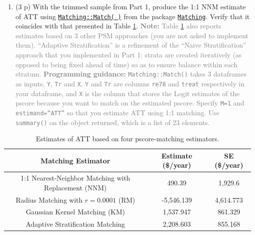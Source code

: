 \documentclass[
]{article}
\providecommand{\tightlist}{%
  \setlength{\itemsep}{0pt}\setlength{\parskip}{0pt}}
\begin{document}
\begin{enumerate}
\def\labelenumi{\arabic{enumi}.}
\setcounter{enumi}{5}
\tightlist
\item
  (3 p) With the trimmed sample from Part 1, produce the 1:1 NNM
  estimate of ATT using
  \href{https://www.rdocumentation.org/packages/Matching/versions/4.9-6/topics/Match}{\texttt{Matching::Match( )}}
  from the package
  \href{https://cran.r-project.org/web/packages/Matching/Matching.pdf}{\texttt{Matching}}.
  Verify that it coincides with that presented in Table
  \ref{tab:Tab25-4_2}.
  \textcolor{gray}{\textbf{Note:} Table \ref{tab:Tab25-4_2} also reports estimates based on 3 other PSM approaches (you are not asked to implement them). ``Adaptive Stratification'' is a refinement of the ``Naive Stratification'' approach that you implemented in Part 1: strata are created iteratively (as opposed to being fixed ahead of time) so as to ensure balance within each stratum.}
  \textcolor{gray}{\textbf{Programming guidance:} \texttt{Matching::Match()} takes 3 dataframes as inputs, \texttt{Y}, \texttt{Tr} and \texttt{X}. \texttt{Y} and \texttt{Tr} are columns \texttt{re78} and \texttt{treat} respectively in your dataframe, and \texttt{X} is the column that stores the Logit estimates of the pscore because you want to match on the estimated pscore. Specify \texttt{M=1} and \texttt{estimand=``ATT''} so that you estimate ATT using 1:1 matching. Use \texttt{summary()} on the object returned, which is a list of 23 elements.}
  \label{item:estimate-att-ncs}
\end{enumerate}

\begin{table}[h]
\centering
\begin{tabular}{ccc}
\hline \hline
\textbf{Matching Estimator} & \textbf{Estimate (\$/year)} & \textbf{SE (\$/year)} \\ \hline
1:1 Nearest-Neighbor Matching with Replacement (NNM)       &  490.39 & 1,929.6  \\
Radius Matching with $r=0.0001$ (RM)  &  -5,546.139 &  4,614.773 \\
Gaussian Kernel Matching (KM)        &  1,537.947 & 861.329  \\ 
Adaptive Stratification Matching     &  2,208.603 &  855.168 \\ \hline
\end{tabular}
\caption{Estimates of ATT based on four pscore-matching estimators.}
\label{tab:Tab25-4_2}
\end{table}
\end{document}
